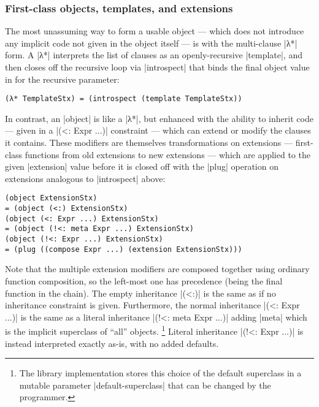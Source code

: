 \subsubsection{First-class objects, templates, and extensions}

The most unassuming way to form a usable object --- which does not introduce any implicit code not given in the object itself --- is with the multi-clause \scm|λ*| form.  A \scm|λ*| interprets the list of clauses as an openly-recursive \scm|template|, and then closes off the recursive loop via \scm|introspect| that binds the final object value in for the recursive parameter:
\begin{verbatim}
(λ* TemplateStx) = (introspect (template TemplateStx))
\end{verbatim}

In contrast, an \scm|object| is like a \scm|λ*|, but enhanced with the ability to inherit code --- given in a \scm|(<: Expr ...)| constraint --- which can extend or modify the clauses it contains.
These modifiers are themselves transformations on extensions --- first-class functions from old extensions to new extensions --- which are applied to the given \scm|extension| value before it is closed off with the \scm|plug| operation on extensions analogous to \scm|introspect| above:
\begin{verbatim}
(object ExtensionStx)
= (object (<:) ExtensionStx)
(object (<: Expr ...) ExtensionStx)
= (object (!<: meta Expr ...) ExtensionStx)
(object (!<: Expr ...) ExtensionStx)
= (plug ((compose Expr ...) (extension ExtensionStx)))
\end{verbatim}
Note that the multiple extension modifiers are composed together using ordinary function composition, so the left-most one has precedence (being the final function in the chain).
The empty inheritance \scm|(<:)| is the same as if no inheritance constraint is given.
Furthermore, the normal inheritance \scm|(<: Expr ...)| is the same as a literal inheritance \scm|(!<: meta Expr ...)| adding \scm|meta| which is the implicit superclass of ``all'' objects.%
\footnote{The library implementation stores this choice of the default superclass in a mutable parameter \scm|default-superclass| that can be changed by the programmer.}
Literal inheritance \scm|(!<: Expr ...)| is instead interpreted exactly as-is, with no added defaults.

